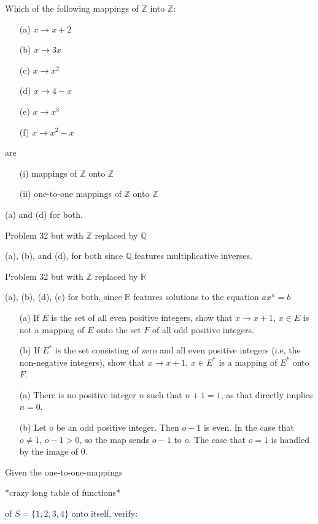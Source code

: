 \exercise
Which of the following mappings of $\mathbb{Z}$ into $\mathbb{Z}$:
\begin{itemize}
    \item[(a)]
        $x \to x +2$
    \item[(b)]
        $x \to 3x$
    \item[(c)]
        $x \to x^2$
    \item[(d)]
        $x \to 4-x$
    \item[(e)]
        $x \to x^3$
    \item[(f)]
        $x \to x^2-x$
\end{itemize}
are 
\begin{itemize}
    \item[(i)]
        mappings of $\mathbb{Z}$ onto $\mathbb{Z}$
    \item[(ii)]
        one-to-one mappings of $\mathbb{Z}$ onto $\mathbb{Z}$
\end{itemize}

\answer
(a) and (d) for both.


\exercise
Problem 32 but with $\mathbb{Z}$ replaced by $\mathbb{Q}$

\answer
(a), (b), and (d), for both since $\mathbb{Q}$ features multiplicative inverses.


\exercise
Problem 32 but with $\mathbb{Z}$ replaced by $\mathbb{R}$

\answer
(a), (b), (d), (e) for both, since $\mathbb{R}$ features solutions to the equation $ax^n = b$


\exercise
\begin{itemize}
    \item[(a)]
        If $E$ is the set of all even positive integers, show that $x \to x+1$, $x \in E$ is not a mapping of $E$ onto the set $F$ of all odd positive integers.
    \item[(b)]
        If $E^*$ is the set consisting of zero and all even positive integers (i.e, the non-negative integers), show that $x \to x+1$, $x \in E^*$ is a mapping of $E^*$ onto $F$.
\end{itemize}

\answer
\begin{itemize}
    \item[(a)]
        There is no positive integer $n$ such that $n+1 = 1$, as that directly implies $n = 0$.
    \item[(b)]
        Let $o$ be an odd positive integer. Then $o-1$ is even. In the case that $o \neq 1$, $o-1 > 0$, so the map sends $o-1$ to $o$. The case that $o = 1$ is handled by the image of $0$.
\end{itemize}


\exercise
Given the one-to-one-mappings
\begin{center}
    *crazy long table of functions*
\end{center}
of $S  = \{1, 2, 3, 4\}$ onto itself, verify:
